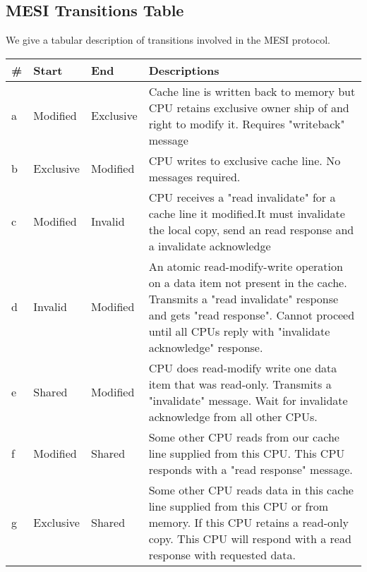 \documentclass{article}
\begin{document}


\subsection{MESI Transitions Table}

We give a tabular description of transitions involved in the MESI
protocol.



\begin{tabular} {| l | l | l | p{9cm}| }    
    \hline
    \# & Start  & End   & Descriptions \\
    \hline
    a & Modified  & Exclusive &
    Cache line is written back to memory but CPU retains exclusive 
    owner ship of and right to modify it. Requires "writeback" 
    message\\
    \hline
    b& Exclusive & Modified &  
    CPU writes to exclusive cache line. No messages required. \\
    \hline
    c & Modified & Invalid &   
    CPU receives a "read invalidate" for a cache line it modified.It 
    must invalidate the local copy, send an read response and a 
    invalidate acknowledge \\
    \hline
    d & Invalid & Modified &
    An atomic read-modify-write operation on a data item not present
    in the cache. Transmits a "read invalidate" response and gets
    "read response". Cannot proceed until all CPUs reply with
    "invalidate acknowledge" response.    \\

    \hline
    e & Shared & Modified & 

    CPU does read-modify write one data item that was
    read-only. Transmits a "invalidate" message. Wait for invalidate
    acknowledge from all other CPUs.    
    \\
    \hline
    f & Modified & Shared &

    Some other CPU reads from our cache line supplied from this
    CPU. This CPU responds with a "read response" message.    
    \\    
    \hline

    g & Exclusive & Shared & 


    Some other CPU reads data in this cache line supplied from this
    CPU or from memory. If this CPU retains a read-only copy. This CPU
    will respond with a read response with requested data.
    

\end{tabular}
\end{document}
